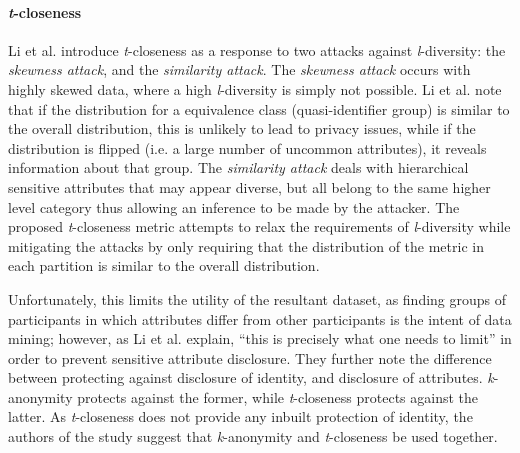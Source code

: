 
\paragraph{\textit{t}-closeness}

Li et al. \cite{Li2007} introduce \textit{t}-closeness as a response to two attacks against \textit{l}-diversity: the \textit{skewness attack}, and the \textit{similarity attack}. The \textit{skewness attack} occurs with highly skewed data, where a high \textit{l}-diversity is simply not possible. Li et al. note that if the distribution for a equivalence class (quasi-identifier group) is similar to the overall distribution, this is unlikely to lead to privacy issues, while if the distribution is flipped (i.e. a large number of uncommon attributes), it reveals information about that group. The \textit{similarity attack} deals with hierarchical sensitive attributes that may appear diverse, but all belong to the same higher level category thus allowing an inference to be made by the attacker. The proposed \textit{t}-closeness metric attempts to relax the requirements of \textit{l}-diversity while mitigating the attacks by only requiring that the distribution of the metric in each partition is similar to the overall distribution.

Unfortunately, this limits the utility of the resultant dataset, as finding groups of participants in which attributes differ from other participants is the intent of data mining; however, as Li et al. explain, ``this is precisely what one needs to limit'' in order to prevent sensitive attribute disclosure. They further note the difference between protecting against disclosure of identity, and disclosure of attributes. \textit{k}-anonymity protects against the former, while \textit{t}-closeness protects against the latter. As \textit{t}-closeness does not provide any inbuilt protection of identity, the authors of the study suggest that \textit{k}-anonymity and \textit{t}-closeness be used together.


